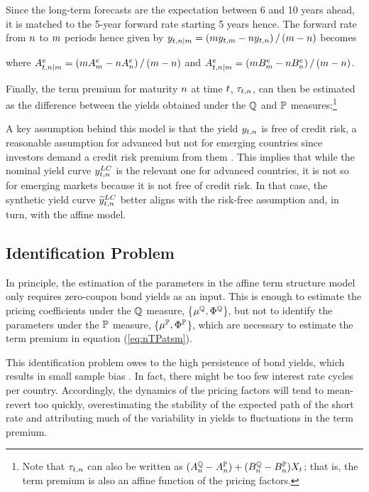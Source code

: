 {Since the long-term forecasts are the expectation between 6 and 10 years ahead, it is matched to the 5-year forward rate starting 5 years hence. The forward rate from \(n\) to \(m\) periods hence
given by \(y_{t,n | m} = \left( m y_{t,m} - n y_{t,n} \right)/ \left( m - n \right)\) becomes
	
\noindent where \(A_{t,n | m}^{e} = \left( m A_{m}^{e} - n A_{n}^{e} \right)/ \left( m - n \right)\)  and \(A_{t,n | m}^{e} = \left( m B_{m}^{e} - n B_{n}^{e} \right)/ \left( m - n \right)\).

Finally, the term premium for maturity \(n\) at time \(t\), \(\tau_{t,n}\), can then be estimated as the difference between the yields obtained under the \(\mathbb{Q}\) and \(\mathbb{P}\) measures:\footnote{ Note that \(\tau_{t,n}\) can also be written as \( (A_{n}^{\mathbb{Q}} - A_{n}^{\mathbb{P}}) + (B_{n}^{\mathbb{Q}}  - B_{n}^{\mathbb{P}}) X_{t} \); that is, the term premium is also an affine function of the pricing factors.}
	
A key assumption behind this model is that the yield \(y_{t,n}\) is free of credit risk, a reasonable assumption for advanced but not for emerging countries since investors demand a credit risk premium from them \citep{DuSchreger:2016JoF}. 
This implies that while the nominal yield curve \(y_{t,n} ^{LC}\) is the relevant one for advanced countries, it is not so for emerging markets because it is not free of credit risk.
In that case, the synthetic yield curve \(\widetilde{y}_{t,n} ^{LC}\) better aligns with the risk-free assumption and, in turn, with the affine model.

\subsection{Identification Problem} \label{sec:Identification}
\iftoggle{toclinks}{\gototoc}{} %

In principle, the estimation of the parameters in the affine term structure model only  requires zero-coupon bond yields as an input.
This is enough to estimate the pricing coefficients under the \(\mathbb{Q}\) measure,
\{\(\mu^{\mathbb{Q}}, \Phi^{\mathbb{Q}}\)\}, but not to identify the parameters under the \(\mathbb{P}\) measure, 
\{\(\mu^{\mathbb{P}}, \Phi^{\mathbb{P}}\)\}, which are necessary to estimate the term premium in equation (\ref{eq:nTPatsm}).

This identification problem owes to the high persistence of bond yields, which results in small sample bias \citep{KimOrphanides:2012}. 
In fact, there might be too few interest rate cycles per country.
Accordingly, the dynamics of the pricing factors will tend to mean-revert too quickly, overestimating the stability of the expected path of the short rate and attributing much of the variability in yields to fluctuations in the term premium.

}
